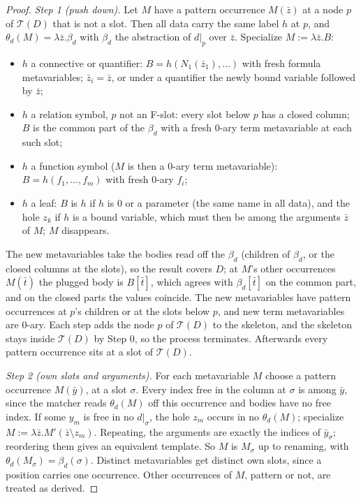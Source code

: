 \begin{proof}
\emph{Step 1 (push down).} Let $M$ have a pattern occurrence $M(\bar z)$ at a node $p$ of $\mathcal T(D)$ that is not a slot. Then all data carry the same label $h$ at $p$, and $\theta_d(M)=\lambda\bar z.\beta_d$ with $\beta_d$ the abstraction of $d|_p$ over $\bar z$. Specialize $M:=\lambda\bar z.B$:
\begin{itemize}
\item $h$ a connective or quantifier: $B=h(N_1(\bar z_1),\dots)$ with fresh formula metavariables; $\bar z_i=\bar z$, or under a quantifier the newly bound variable followed by $\bar z$;
\item $h$ a relation symbol, $p$ not an F-slot: every slot below $p$ has a closed column; $B$ is the common part of the $\beta_d$ with a fresh $0$-ary term metavariable at each such slot;
\item $h$ a function symbol ($M$ is then a $0$-ary term metavariable): $B=h(f_1,\dots,f_m)$ with fresh $0$-ary $f_i$;
\item $h$ a leaf: $B$ is $h$ if $h$ is $0$ or a parameter (the same name in all data), and the hole $z_k$ if $h$ is a bound variable, which must then be among the arguments $\bar z$ of $M$; $M$ disappears.
\end{itemize}
The new metavariables take the bodies read off the $\beta_d$ (children of $\beta_d$, or the closed columns at the slots), so the result covers $D$; at $M$'s other occurrences $M(\bar t)$ the plugged body is $B[\bar t]$, which agrees with $\beta_d[\bar t]$ on the common part, and on the closed parts the values coincide. The new metavariables have pattern occurrences at $p$'s children or at the slots below $p$, and new term metavariables are $0$-ary. Each step adds the node $p$ of $\mathcal T(D)$ to the skeleton, and the skeleton stays inside $\mathcal T(D)$ by Step 0, so the process terminates. Afterwards every pattern occurrence sits at a slot of $\mathcal T(D)$.

\emph{Step 2 (own slots and arguments).} For each metavariable $M$ choose a pattern occurrence $M(\bar y)$, at a slot $\sigma$. Every index free in the column at $\sigma$ is among $\bar y$, since the matcher reads $\theta_d(M)$ off this occurrence and bodies have no free index. If some $y_m$ is free in no $d|_\sigma$, the hole $z_m$ occurs in no $\theta_d(M)$; specialize $M:=\lambda\bar z.M'(\bar z\setminus z_m)$. Repeating, the arguments are exactly the indices of $\bar y_\sigma$; reordering them gives an equivalent template. So $M$ is $M_\sigma$ up to renaming, with $\theta_d(M_\sigma)=\beta_d(\sigma)$. Distinct metavariables get distinct own slots, since a position carries one occurrence. Other occurrences of $M$, pattern or not, are treated as derived.


\end{proof}
